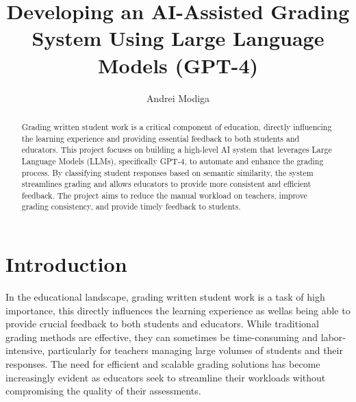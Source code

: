 \documentclass[ms,twoside,print]{nuthesis}
\begin{document}
\frontmatter

\title{Developing an AI-Assisted Grading System Using Large Language Models (GPT-4)}
\author{Andrei Modiga}



\maketitle

\begin{abstract}
    Grading written student work is a critical component of education, directly influencing the learning experience and providing essential feedback to both students and educators. This project focuses on building a high-level AI system that leverages Large Language Models (LLMs), specifically GPT-4, to automate and enhance the grading process. By classifying student responses based on semantic similarity, the system streamlines grading and allows educators to provide more consistent and efficient feedback. The project aims to reduce the manual workload on teachers, improve grading consistency, and provide timely feedback to students.
\end{abstract}

\setcounter{tocdepth}{2} %
\tableofcontents
\listoffigures
\listoftables

\mainmatter

\chapter{Introduction}
In the educational landscape, grading written student work is a task of high importance, this directly influences the learning experience as wellas being able to provide crucial feedback to both students and educators. While traditional grading methods are effective, they can sometimes be time-consuming and labor-intensive, particularly for teachers managing large volumes of students and their responses. The need for efficient and scalable grading solutions has become increasingly evident as educators seek to streamline their workloads without compromising the quality of their assessments.
\end{document}

